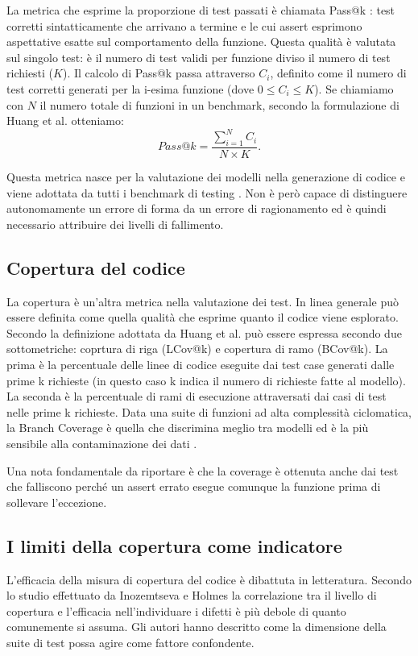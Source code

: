 La metrica che esprime la proporzione di test passati è chiamata Pass@k \cite{chen2021humaneval}: test corretti sintatticamente che arrivano a termine e le cui assert esprimono aspettative esatte sul comportamento della funzione. Questa qualità è valutata sul singolo test: è il numero di test validi per funzione diviso il numero di test richiesti ($K$). Il calcolo di Pass@k passa attraverso $C_i$, definito come il numero di test corretti generati per la i-esima funzione (dove $0 \leq C_i \leq K$). Se chiamiamo con $N$ il numero totale di funzioni in un benchmark, secondo la formulazione di Huang et al. \cite{huang2025ult} otteniamo: \begin{equation}
Pass@k = \frac{\sum_{i=1}^{N} C_i}{N \times K}.
\label{eq:passk}
\end{equation} 

Questa metrica nasce per la valutazione dei modelli nella generazione di codice \cite{chen2021humaneval} e viene adottata da tutti i benchmark di testing \cite{huang2025ult, wang2025testeval, jain2025testgeneval}. Non è però capace di distinguere autonomamente un errore di forma da un errore di ragionamento ed è quindi necessario attribuire dei livelli di fallimento.



\subsection{Copertura del codice}
La copertura è un'altra metrica nella valutazione dei test. In linea generale può essere definita come quella qualità che esprime quanto il codice viene esplorato. Secondo la definizione adottata da Huang et al. \cite{huang2025ult} può essere espressa secondo due sottometriche: coprtura di riga (LCov@k) e copertura di ramo (BCov@k). La prima è la percentuale delle linee di codice eseguite dai test case generati dalle prime k richieste (in questo caso k indica il numero di richieste fatte al modello). La seconda è la percentuale di rami di esecuzione attraversati dai casi di test nelle prime k richieste. Data una suite di funzioni ad alta complessità ciclomatica, la Branch Coverage è quella che discrimina meglio tra modelli ed è la più sensibile alla contaminazione dei dati \cite{huang2025ult}.

Una nota fondamentale da riportare è che la coverage è ottenuta anche dai test che falliscono perché un assert errato esegue comunque la funzione prima di sollevare l'eccezione.


\subsection{I limiti della copertura come indicatore}
L'efficacia della misura di copertura del codice è dibattuta in letteratura. Secondo lo studio effettuato da Inozemtseva e Holmes \cite{inozemtseva2014coverage} la correlazione tra il livello di copertura e l'efficacia nell'individuare i difetti è più debole di quanto comunemente si assuma. Gli autori hanno descritto come la dimensione della suite di test possa agire come fattore confondente.


